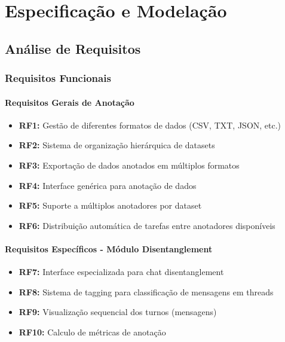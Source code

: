 \chapter{Especificação e Modelação}

\section{Análise de Requisitos}

\subsection{Requisitos Funcionais}

\subsubsection{Requisitos Gerais de Anotação}

\begin{itemize}
    \item \textbf{RF1:} Gestão de diferentes formatos de dados (CSV, TXT, JSON, etc.)
    \item \textbf{RF2:} Sistema de organização hierárquica de datasets
    \item \textbf{RF3:} Exportação de dados anotados em múltiplos formatos
    \item \textbf{RF4:} Interface genérica para anotação de dados
    \item \textbf{RF5:} Suporte a múltiplos anotadores por dataset
    \item \textbf{RF6:} Distribuição automática de tarefas entre anotadores disponíveis
\end{itemize}

\subsubsection{Requisitos Específicos - Módulo Disentanglement}

\begin{itemize}
    \item \textbf{RF7:} Interface especializada para chat disentanglement
    \item \textbf{RF8:} Sistema de tagging para classificação de mensagens em threads
    \item \textbf{RF9:} Visualização sequencial dos turnos (mensagens)
    \item \textbf{RF10:} Calculo de métricas de anotação
\end{itemize}

